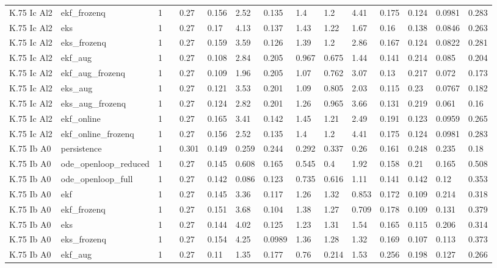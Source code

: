 \begin{table}[t]
\begin{tabular}{lllllllllllllll}
K.75 Ic Al2 & ekf\_frozenq & 1 &  & 0.27 & 0.156 & 2.52 & 0.135 & 1.4 & 1.2 & 4.41 & 0.175 & 0.124 & 0.0981 & 0.283 \\
K.75 Ic Al2 & eks & 1 &  & 0.27 & 0.17 & 4.13 & 0.137 & 1.43 & 1.22 & 1.67 & 0.16 & 0.138 & 0.0846 & 0.263 \\
K.75 Ic Al2 & eks\_frozenq & 1 &  & 0.27 & 0.159 & 3.59 & 0.126 & 1.39 & 1.2 & 2.86 & 0.167 & 0.124 & 0.0822 & 0.281 \\
K.75 Ic Al2 & ekf\_aug & 1 &  & 0.27 & 0.108 & 2.84 & 0.205 & 0.967 & 0.675 & 1.44 & 0.141 & 0.214 & 0.085 & 0.204 \\
K.75 Ic Al2 & ekf\_aug\_frozenq & 1 &  & 0.27 & 0.109 & 1.96 & 0.205 & 1.07 & 0.762 & 3.07 & 0.13 & 0.217 & 0.072 & 0.173 \\
K.75 Ic Al2 & eks\_aug & 1 &  & 0.27 & 0.121 & 3.53 & 0.201 & 1.09 & 0.805 & 2.03 & 0.115 & 0.23 & 0.0767 & 0.182 \\
K.75 Ic Al2 & eks\_aug\_frozenq & 1 &  & 0.27 & 0.124 & 2.82 & 0.201 & 1.26 & 0.965 & 3.66 & 0.131 & 0.219 & 0.061 & 0.16 \\
K.75 Ic Al2 & ekf\_online & 1 &  & 0.27 & 0.165 & 3.41 & 0.142 & 1.45 & 1.21 & 2.49 & 0.191 & 0.123 & 0.0959 & 0.265 \\
K.75 Ic Al2 & ekf\_online\_frozenq & 1 &  & 0.27 & 0.156 & 2.52 & 0.135 & 1.4 & 1.2 & 4.41 & 0.175 & 0.124 & 0.0981 & 0.283 \\
K.75 Ib A0 & persistence & 1 &  & 0.301 & 0.149 & 0.259 & 0.244 & 0.292 & 0.337 & 0.26 & 0.161 & 0.248 & 0.235 & 0.18 \\
K.75 Ib A0 & ode\_openloop\_reduced & 1 &  & 0.27 & 0.145 & 0.608 & 0.165 & 0.545 & 0.4 & 1.92 & 0.158 & 0.21 & 0.165 & 0.508 \\
K.75 Ib A0 & ode\_openloop\_full & 1 &  & 0.27 & 0.142 & 0.086 & 0.123 & 0.735 & 0.616 & 1.11 & 0.141 & 0.142 & 0.12 & 0.353 \\
K.75 Ib A0 & ekf & 1 &  & 0.27 & 0.145 & 3.36 & 0.117 & 1.26 & 1.32 & 0.853 & 0.172 & 0.109 & 0.214 & 0.318 \\
K.75 Ib A0 & ekf\_frozenq & 1 &  & 0.27 & 0.151 & 3.68 & 0.104 & 1.38 & 1.27 & 0.709 & 0.178 & 0.109 & 0.131 & 0.379 \\
K.75 Ib A0 & eks & 1 &  & 0.27 & 0.144 & 4.02 & 0.125 & 1.23 & 1.31 & 1.54 & 0.165 & 0.115 & 0.206 & 0.314 \\
K.75 Ib A0 & eks\_frozenq & 1 &  & 0.27 & 0.154 & 4.25 & 0.0989 & 1.36 & 1.28 & 1.32 & 0.169 & 0.107 & 0.113 & 0.373 \\
K.75 Ib A0 & ekf\_aug & 1 &  & 0.27 & 0.11 & 1.35 & 0.177 & 0.76 & 0.214 & 1.53 & 0.256 & 0.198 & 0.127 & 0.266 \\

\end{tabular}
\end{table}
